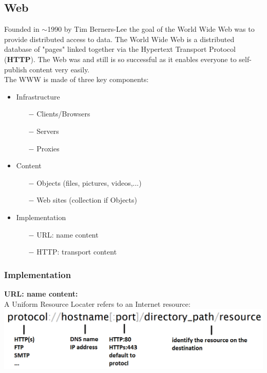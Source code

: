 \documentclass[a4paper, fontsize=8pt, landscape, DIV=1]{scrartcl}
\begin{document}
\begin{multicols*}{4}
		\subsection{Web}
		Founded in $\sim$1990 by Tim Berners-Lee the goal of the World Wide Web was to provide distributed access to data. The World Wide Web is a distributed database of "pages" linked together via the Hypertext Transport Protocol (\textbf{HTTP}). The Web was and still is so successful as it enables everyone to self-publish content very easily.\\
		The WWW is made of three key components: 
		\begin{itemize}[noitemsep]
			\item Infrastructure
			\begin{itemize}
				\item[$-$] Clients/Browsers
				\item[$-$] Servers
				\item[$-$] Proxies
			\end{itemize}
			\item Content
			\begin{itemize}
				\item[$-$] Objects (files, pictures, videos,...)
				\item[$-$] Web sites (collection if Objects)
			\end{itemize}
			\item Implementation
			\begin{itemize}
				\item[$-$] URL: name content
				\item[$-$] HTTP: transport content
			\end{itemize}
		\end{itemize}
		
		\subsubsection{Implementation}
		\textbf{URL: name content:}\\
		A Uniform Resource Locater refers to an Internet resource:\\
		\includegraphics[width=\columnwidth]{images/Application_Layer/web_url.png}
		\par 
		

\end{multicols*}
\end{document}

